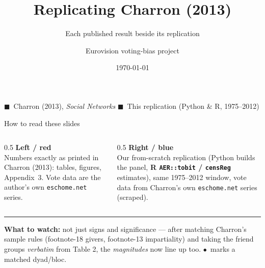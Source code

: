 \documentclass[aspectratio=169,10pt]{beamer}
\title[Charron (2013): Replication]{Replicating Charron (2013)}
\subtitle{Each published result beside its replication}
\author{Eurovision voting-bias project}
\date{\today}
\newcommand{\paper}[1]{{\color{papercol}#1}}
\newcommand{\rep}[1]{{\color{repcol}#1}}
\newcommand{\hit}{{\color{papercol!55!repcol}$\bullet$}}
\begin{document}
{
\begin{frame}[plain]
  \titlepage
  \begin{center}\small
  \paper{$\blacksquare$~Charron (2013), \emph{Social Networks}}\qquad
  \rep{$\blacksquare$~This replication (Python \& R, 1975--2012)}
  \end{center}
\end{frame}}

\begin{frame}{How to read these slides}
  \begin{columns}[T]
    \begin{column}{0.5\textwidth}
      \textbf{\paper{Left / red}} \\[2pt]
      Numbers exactly as printed in Charron (2013): tables, figures,
      Appendix~3. Vote data are the author's own \texttt{eschome.net} series.
    \end{column}
    \begin{column}{0.5\textwidth}
      \textbf{\rep{Right / blue}} \\[2pt]
      Our from-scratch replication (Python builds the panel, \textbf{R
      \texttt{AER::tobit} / \texttt{censReg}} estimates), same 1975--2012 window,
      vote data from Charron's own \texttt{eschome.net} series (scraped).
    \end{column}
  \end{columns}
  \vspace{6pt}
  \hrule
  \vspace{6pt}
  \footnotesize
  \textbf{What to watch:} not just signs and significance --- after matching
  Charron's sample rules (footnote-18 givers, footnote-13 impartiality) and
  taking the friend groups \emph{verbatim} from Table 2, the \emph{magnitudes}
  now line up too. \hit\ marks a matched dyad/bloc.
\end{frame}

\end{document}

